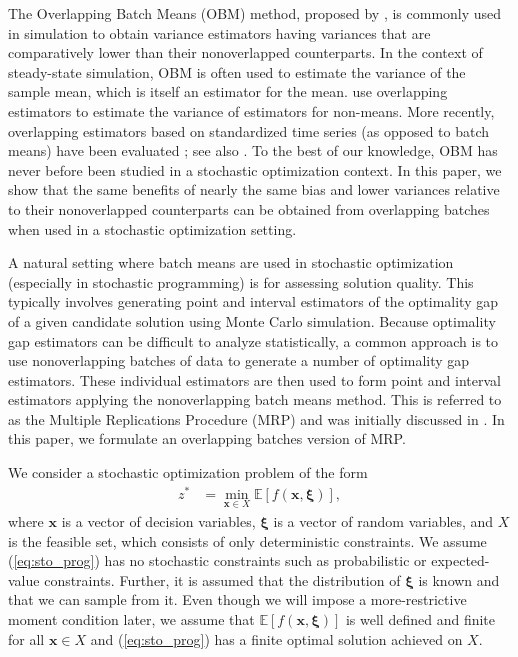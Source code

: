 \documentclass[12pt]{article}
\newcommand{\e}[1]{\mathbb{E} \left[ #1 \right]
}
\newcommand{\x}{\mathbf{x}}
\newcommand{\xit}{\boldsymbol{\xi}}
\begin{document}
The Overlapping Batch Means (OBM) method, proposed by \citet{Meketon1984}, is commonly used in simulation to obtain variance estimators having variances that are comparatively lower than their nonoverlapped counterparts. 
In the context of steady-state simulation, OBM is often used to estimate the variance of the sample mean, which is itself an estimator for the mean. 
\cite{SAH90} use overlapping estimators to estimate the variance of estimators for non-means. 
More recently, overlapping estimators based on standardized time series (as opposed to batch means) have been evaluated \citep{Alexopoulos01012007,Alexopoulos2007}; see also \citep{Meterelliyoz_etal_12}.
To the best of our knowledge, OBM has never before been studied in a stochastic optimization context. 
In this paper, we show that the same benefits of nearly the same bias and lower variances relative to their nonoverlapped counterparts can be obtained from overlapping batches when used in a stochastic optimization setting.
  
A natural setting where batch means are used in stochastic optimization (especially in stochastic programming) is for assessing solution quality. 
This typically involves generating point and interval estimators of the optimality gap of a given candidate solution using Monte Carlo simulation. 
Because optimality gap estimators can be difficult to analyze statistically, a common approach is to use nonoverlapping batches of data to generate a number of optimality gap estimators. 
These individual estimators are then used to form point and interval estimators applying the nonoverlapping batch means method.
This is referred to as the Multiple Replications Procedure (MRP) and was initially discussed in \citep{Mak1999}.   
In this paper, we formulate an overlapping batches version of MRP.


We consider a stochastic optimization problem of the form 
\begin{align} \tag{SP} \label{eq:sto_prog} 
	z^* & = \min_{\x \in X} \e{f(\x,\xit)},
\end{align}
where $\x$ is a vector of decision variables, $\xit$ is a vector of random variables, and $X$ is the feasible set, which consists of only deterministic constraints. 
We assume (\ref{eq:sto_prog}) has no stochastic constraints such as probabilistic or expected-value constraints. 
Further, it is assumed that the distribution of $\xit$ is known and that we can sample from it.
Even though we will impose a more-restrictive moment condition later, we assume that $\e{f(\x,\xit)}$ is well defined and finite for all $\x \in X$ and (\ref{eq:sto_prog}) has a finite optimal solution achieved on $X$.
\end{document}
